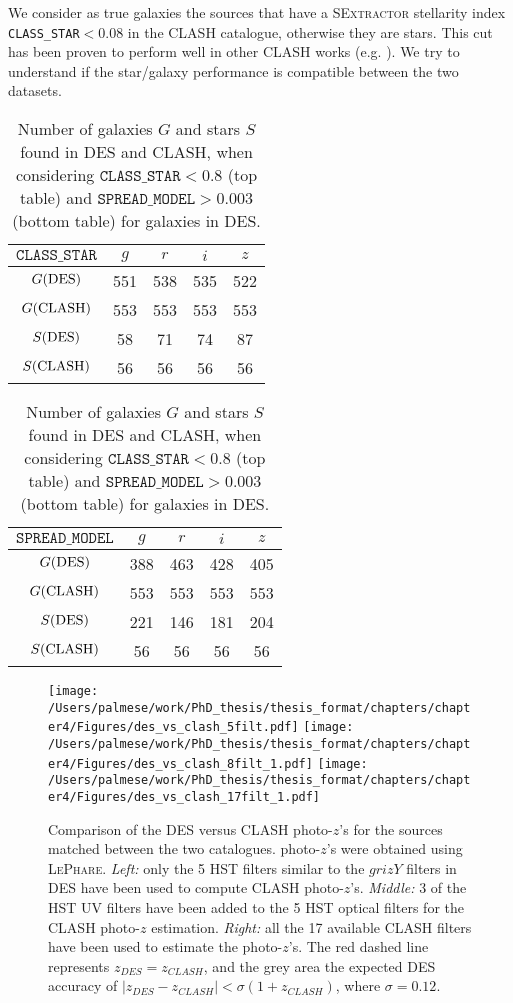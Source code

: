 {We consider as true galaxies the sources that have a \textsc{SExtractor} stellarity index \texttt{CLASS\_STAR}$<0.08$ in the CLASH catalogue, otherwise they are stars. This cut has been proven to perform well in other CLASH works (e.g. \citealt{jouvel}). We try to understand if the star/galaxy performance is compatible between the two datasets.\\  

\begin{table}\centering
\begin{tabular}{c|cccc}
$\texttt{CLASS\_STAR}$&$g$&$r$&$i$&$z$\\
\hline
 $ G({\rm DES})$&    551&      538&      535&      522\\
  $G({\rm CLASH})$ &   553 &      553&      553   &   553\\
   $S({\rm  DES})$&  58 &      71&      74&      87\\
   $S({\rm CLASH})$& 56&      56&      56&      56\\
\end{tabular}\hskip 0.3cm
\begin{tabular}{c|cccc}
 $\texttt{SPREAD\_MODEL}$&$g$&$r$&$i$&$z$\\
\hline
 $ G({\rm DES})$&    388&      463&      428&      405\\
 $G({\rm CLASH})$ &   553 &      553&      553   &   553\\
   $S({\rm DES})$&  221 &      146&     181&      204\\
  $S({\rm CLASH})$& 56&      56&      56&      56\\
\end{tabular}\caption{Number of galaxies $G$ and stars $S$ found in DES and CLASH, when considering $\texttt{CLASS\_STAR}<0.8$ (top table) and $\texttt{SPREAD\_MODEL}>0.003$ (bottom table) for galaxies in DES.}\label{numbergal}
\end{table}
\begin{figure}
\vspace{ -0.5cm}\texttt{[image: /Users/palmese/work/PhD\_thesis/thesis\_format/chapters/chapter4/Figures/des\_vs\_clash\_5filt.pdf]} \hspace{-0.1cm}\texttt{[image: /Users/palmese/work/PhD\_thesis/thesis\_format/chapters/chapter4/Figures/des\_vs\_clash\_8filt\_1.pdf]} \hspace{-0.22cm} \texttt{[image: /Users/palmese/work/PhD\_thesis/thesis\_format/chapters/chapter4/Figures/des\_vs\_clash\_17filt\_1.pdf]}
\caption{Comparison of the DES versus CLASH photo-$z$'s for the sources matched between the two catalogues. photo-$z$'s were obtained using \textsc{LePhare}. \emph{Left:} only the 5 HST filters similar to the $grizY$ filters in DES have been used to compute CLASH photo-$z$'s. \emph{Middle:} 3 of the HST UV filters have been added to the 5 HST optical filters for the CLASH photo-$z$ estimation. \emph{Right:} all the 17 available CLASH filters have been used to estimate the photo-$z$'s. The red dashed line represents $z_{DES}=z_{CLASH}$, and the grey area the expected DES accuracy of $|z_{DES}-z_{CLASH}|< \sigma(1+z_{CLASH})$, where $\sigma=0.12$.}\label{photoz}
\end{figure}

}
